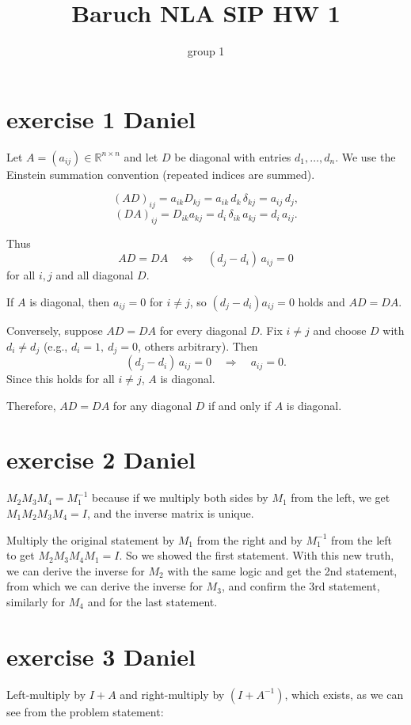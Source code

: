 \documentclass{article}
\title{Baruch NLA SIP HW 1}
\author{group 1}
\begin{document}
\maketitle
\tableofcontents

\section{exercise 1 Daniel}
Let \(A = (a_{ij}) \in \mathbb{R}^{n\times n}\) and let \(D\) be diagonal with entries \(d_1, \dots, d_n\).
We use the Einstein summation convention (repeated indices are summed).

\[
    (AD)_{ij} = a_{ik} D_{kj} = a_{ik} \, d_k \, \delta_{kj} = a_{ij} \, d_j,
\]
\[
    (DA)_{ij} = D_{ik} a_{kj} = d_i \, \delta_{ik} \, a_{kj} = d_i \, a_{ij}.
\]

Thus
\[
    AD = DA \quad \Longleftrightarrow \quad (d_j - d_i)\, a_{ij} = 0
\]
for all \(i,j\) and all diagonal \(D\).

If \(A\) is diagonal, then \(a_{ij} = 0\) for \(i \neq j\), so \((d_j - d_i)a_{ij} = 0\) holds and \(AD = DA\).

Conversely, suppose \(AD = DA\) for every diagonal \(D\).
Fix \(i \neq j\) and choose \(D\) with \(d_i \neq d_j\) (e.g., \(d_i = 1,\ d_j = 0\), others arbitrary).
Then
\[
    (d_j - d_i)\, a_{ij} = 0 \quad \Longrightarrow \quad a_{ij} = 0.
\]
Since this holds for all \(i \neq j\), \(A\) is diagonal.

Therefore, \(AD = DA\) for any diagonal \(D\) if and only if \(A\) is diagonal.

\section{exercise 2 Daniel}
$M_2 M_3 M_4=M_1^{-1}$ because if we multiply both sides by $M_1$ from the left, we get $M_1 M_2 M_3 M_4 = I$, and the inverse matrix is unique.

Multiply the original statement by $M_1$ from the right and by $M_1^{-1}$ from the left to get $M_2 M_3 M_4 M_1 = I$. So we showed the first statement.
With this new truth, we can derive the inverse for $M_2$ with the same logic and get the 2nd statement,
from which we can derive the inverse for $M_3$, and confirm the 3rd statement, similarly for $M_4$ and for the last statement.

\section{exercise 3 Daniel}
Left-multiply by $I+A$ and right-multiply by $(I+A^{-1})$, which exists, as we can see from the problem statement:
\end{document}
